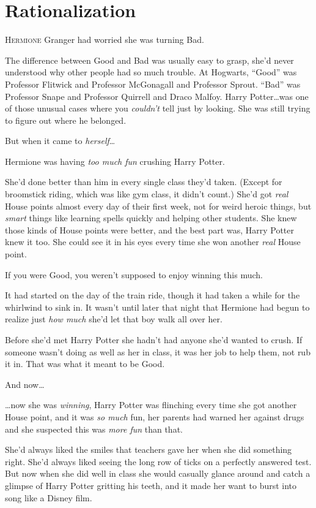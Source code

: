 \chapter{Rationalization}

\lettrine{H}{ermione} Granger had worried she was turning Bad.

The difference between Good and Bad was usually easy to grasp, she’d never
understood why other people had so much trouble. At Hogwarts, “Good” was
Professor Flitwick and Professor McGonagall and Professor Sprout. “Bad” was
Professor Snape and Professor Quirrell and Draco Malfoy. Harry Potter…was
one of those unusual cases where you \emph{couldn’t} tell just by looking.
She was still trying to figure out where he belonged.

But when it came to \emph{herself}…

Hermione was having \emph{too much fun} crushing Harry Potter.

She’d done better than him in every single class they’d taken. (Except for
broomstick riding, which was like gym class, it didn’t count.) She’d got
\emph{real} House points almost every day of their first week, not for weird
heroic things, but \emph{smart} things like learning spells quickly and helping
other students. She knew those kinds of House points were better, and the best
part was, Harry Potter knew it too. She could see it in his eyes every time she
won another \emph{real} House point.

If you were Good, you weren’t supposed to enjoy winning this much.

It had started on the day of the train ride, though it had taken a while for
the whirlwind to sink in. It wasn’t until later that night that Hermione had
begun to realize just \emph{how much} she’d let that boy walk all over her.

Before she’d met Harry Potter she hadn’t had anyone she’d wanted to crush. If
someone wasn’t doing as well as her in class, it was her job to help them, not
rub it in. That was what it meant to be Good.

And now…

…now she was \emph{winning}, Harry Potter was flinching every time she
got another House point, and it was \emph{so much} fun, her parents had warned
her against drugs and she suspected this was \emph{more fun} than that.

She’d always liked the smiles that teachers gave her when she did something
right. She’d always liked seeing the long row of ticks on a perfectly
answered test. But now when she did well in class she would casually glance
around and catch a glimpse of Harry Potter gritting his teeth, and it made her
want to burst into song like a Disney film.

